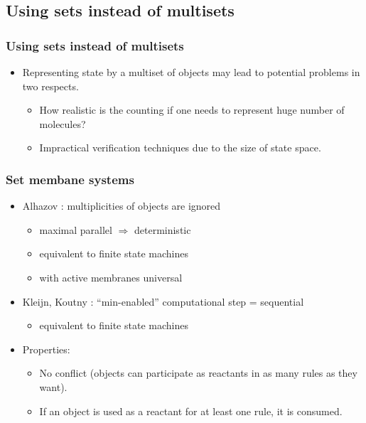 
  \subsection{Using sets instead of multisets} %
  \label{sub:using_sets_instead_of_multisets}
    
    \begin{frame}[t]\frametitle{Using sets instead of multisets}
      \begin{itemize}
        \item Representing state by a multiset of objects may lead to potential problems in two respects.
        \pause
        \begin{itemize}
          \item How realistic is the counting if one needs to represent huge number of molecules?
          \item Impractical verification techniques due to the size of state space.
        \end{itemize}
      \end{itemize}      
    \end{frame}
    \note{}

    \begin{frame}[t]\frametitle{Set membane systems}
      \begin{itemize}
        \item Alhazov \cite{Alhazov05WithoutMultiplicities}: multiplicities of objects are ignored
        \pause
        \begin{itemize}
          \item maximal parallel $\Rightarrow$ deterministic
          \pause
          \item equivalent to finite state machines
          \pause
          \item with active membranes universal
        \end{itemize}
        \pause
        \item Kleijn, Koutny \cite{Kleijn11SetMembrane}: ``min-enabled'' computational step = sequential
        \pause
        \begin{itemize}
          \item equivalent to finite state machines
        \end{itemize}        
        \pause
        \item Properties:
        \begin{itemize}
          \item No conflict (objects can participate as reactants in as many rules as they want).
          \item If an object is used as a reactant for at least one rule, it is consumed.
        \end{itemize}
      \end{itemize}
    \end{frame}
    \note{}

